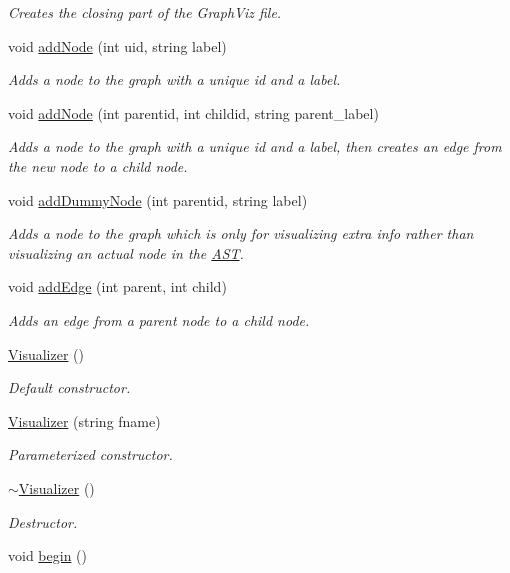\begin{DoxyCompactItemize}
\begin{DoxyCompactList}\small\item\em Creates the closing part of the Graph\-Viz file. \end{DoxyCompactList}\item 
void \hyperlink{classVisualizer_a07370d04b5c04c37c001094d8dea1a19}{add\-Node} (int uid, string label)
\begin{DoxyCompactList}\small\item\em Adds a node to the graph with a unique id and a label. \end{DoxyCompactList}\item 
void \hyperlink{classVisualizer_a24387730bdf8579f07ef7760b5c4fe83}{add\-Node} (int parentid, int childid, string parent\-\_\-label)
\begin{DoxyCompactList}\small\item\em Adds a node to the graph with a unique id and a label, then creates an edge from the new node to a child node. \end{DoxyCompactList}\item 
void \hyperlink{classVisualizer_a135921c797363c4778a16ba0b0ee5e93}{add\-Dummy\-Node} (int parentid, string label)
\begin{DoxyCompactList}\small\item\em Adds a node to the graph which is only for visualizing extra info rather than visualizing an actual node in the \hyperlink{classAST}{A\-S\-T}. \end{DoxyCompactList}\item 
void \hyperlink{classVisualizer_a84454739e84577863200833d99de5976}{add\-Edge} (int parent, int child)
\begin{DoxyCompactList}\small\item\em Adds an edge from a parent node to a child node. \end{DoxyCompactList}\item 
\hyperlink{classVisualizer_a104487003c9fea602e26c072aae27efc}{Visualizer} ()
\begin{DoxyCompactList}\small\item\em Default constructor. \end{DoxyCompactList}\item 
\hyperlink{classVisualizer_a65d978447073196b110504d33bff34c5}{Visualizer} (string fname)
\begin{DoxyCompactList}\small\item\em Parameterized constructor. \end{DoxyCompactList}\item 
\hyperlink{classVisualizer_a013ec3101407fbe4805f289bc32d1265}{$\sim$\-Visualizer} ()
\begin{DoxyCompactList}\small\item\em Destructor. \end{DoxyCompactList}\item 
\hypertarget{classVisualizer_abf6c6d4ce88207fa564ad6238c263aca}{void \hyperlink{classVisualizer_abf6c6d4ce88207fa564ad6238c263aca}{begin} ()}\label{classVisualizer_abf6c6d4ce88207fa564ad6238c263aca}


\end{DoxyCompactItemize}
